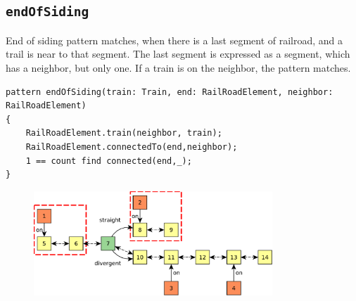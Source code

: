 \subsection{\texttt{endOfSiding}}

End of siding pattern matches, when there is a last segment of railroad, and a trail is near to that segment.
The last segment is expressed as a segment, which has a neighbor, but only one.
If a train is on the neighbor, the pattern matches.

\begin{minipage}{\textwidth}
\begin{lstlisting}[language = vql]
pattern endOfSiding(train: Train, end: RailRoadElement, neighbor: RailRoadElement)
{
	RailRoadElement.train(neighbor, train);		
	RailRoadElement.connectedTo(end,neighbor);
	1 == count find connected(end,_);	
}
\end{lstlisting}

\begin{figure}[H]
	\begin{center}
		\includegraphics[width=0.8\textwidth]{figures/query-example-model-endofsiding.pdf}
	\end{center}
\end{figure}

\end{minipage}
\vspace{\belowdisplayskip}




